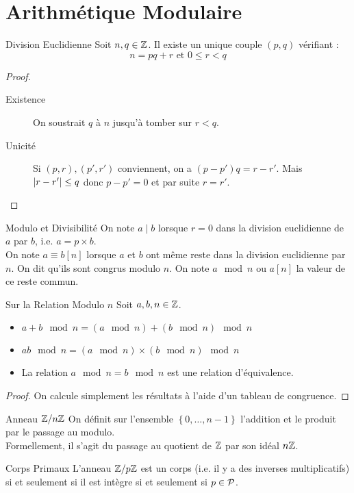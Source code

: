 \documentclass{cours}
\begin{document}
\section{Arithmétique Modulaire}
\begin{théorème}{Division Euclidienne}{}
Soit $n, q \in \mathbb{Z}$. Il existe un unique couple $(p, q)$ vérifiant : 
\[
    n = pq + r \text{ et } 0 \leq r < q
\]
\end{théorème}

\begin{proof}
        \begin{description}
            \item[Existence] On soustrait $q$ à $n$ jusqu'à tomber sur $r < q$.
            \item[Unicité] Si $(p, r), (p', r')$ conviennent, on a $(p - p')q = r - r'$. Mais $\left|r - r'\right| \leq q$ donc $p - p' = 0$ et par suite $r = r'$.
        \end{description}
    \end{proof}

\begin{définition}{Modulo et Divisibilité}{}
On note $a\mid b$ lorsque $r = 0$ dans la division euclidienne de $a$ par $b$, i.e. $a = p\times b$. \\
On note $a \equiv b [n]$ lorsque $a$ et $b$ ont même reste dans la division euclidienne par $n$. On dit qu'ils sont congrus modulo $n$. On note $a\!\mod n$ ou $a [n]$ la valeur de ce reste commun.
\end{définition}
    \begin{propositionfr}{Sur la Relation Modulo $n$}{}
        Soit $a, b, n \in \mathbb{Z}$.
        \begin{itemize}
            \item $a + b \mod n = (a \mod n) + (b \mod n) \mod n$
            \item $ab \mod n = (a \mod n) \times (b \mod n) \mod n$
            \item La relation $a \mod n = b \mod n$ est une relation d'équivalence.
        \end{itemize}
    \end{propositionfr}
    \begin{proof}
        On calcule simplement les résultats à l'aide d'un tableau de congruence.
    \end{proof}

\begin{définition}{Anneau $\mathbb{Z}/n\mathbb{Z}$}{}
On définit sur l'ensemble $\left\{0, \ldots, n - 1\right\}$ l'addition et le produit par le passage au modulo. \\
Formellement, il s'agit du passage au quotient de $\mathbb{Z}$ par son idéal $n\mathbb{Z}$.
\end{définition}
\begin{propositionfr}{Corps Primaux}{}
        L'anneau $\mathbb{Z}/p\mathbb{Z}$ est un corps (i.e. il y a des inverses multiplicatifs) si et seulement si il est intègre si et seulement si $p \in \mathcal{P}$.
    \end{propositionfr}
\end{document}
